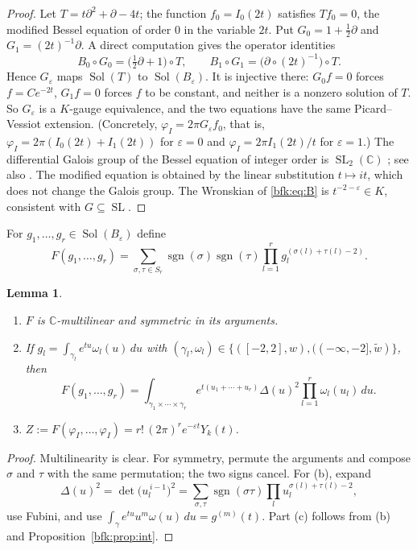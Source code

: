 \documentclass[11pt,a4paper]{article}
\newtheorem{lemma}[theorem]{Lemma}
\theoremstyle{definition}
\theoremstyle{remark}
\numberwithin{equation}{section}
\newcommand{\C}{\mathbb{C}}
\DeclareMathOperator{\Sol}{Sol}
\DeclareMathOperator{\sgn}{sgn}
\DeclareMathOperator{\SL}{SL}
\begin{document}
\begin{proof}
Let $T=t\partial^2+\partial-4t$; the function $f_0=I_0(2t)$ satisfies $Tf_0=0$, the modified Bessel equation of order $0$ in the variable $2t$. Put $G_0=1+\frac12\partial$ and $G_1=(2t)^{-1}\partial$. A direct computation gives the operator identities
\[
B_0\circ G_0=\bigl(\tfrac12\partial+1\bigr)\circ T,\qquad B_1\circ G_1=\bigl(\partial\circ(2t)^{-1}\bigr)\circ T .
\]
Hence $G_\varepsilon$ maps $\Sol(T)$ to $\Sol(B_\varepsilon)$. It is injective there: $G_0f=0$ forces $f=Ce^{-2t}$, $G_1f=0$ forces $f$ to be constant, and neither is a nonzero solution of $T$. So $G_\varepsilon$ is a $K$-gauge equivalence, and the two equations have the same Picard--Vessiot extension. (Concretely, $\varphi_I=2\pi G_\varepsilon f_0$, that is, $\varphi_I=2\pi(I_0(2t)+I_1(2t))$ for $\varepsilon=0$ and $\varphi_I=2\pi I_1(2t)/t$ for $\varepsilon=1$.) The differential Galois group of the Bessel equation of integer order is $\SL_2(\C)$ \cite{Kol68}; see also \cite{vdPS03}. The modified equation is obtained by the linear substitution $t\mapsto it$, which does not change the Galois group. The Wronskian of \eqref{bfk:eq:B} is $t^{-2-\varepsilon}\in K$, consistent with $G\subseteq\SL$.
\end{proof}

For $g_1,\dots,g_r\in\Sol(B_\varepsilon)$ define
\begin{equation}\label{bfk:eq:F}
F(g_1,\dots,g_r)=\sum_{\sigma,\tau\in S_r}\sgn(\sigma)\sgn(\tau)\prod_{l=1}^rg_l^{(\sigma(l)+\tau(l)-2)} .
\end{equation}

\begin{lemma}\label{bfk:lem:F}
\begin{enumerate}
\item[(a)] $F$ is $\C$-multilinear and symmetric in its arguments.
\item[(b)] If $g_l=\int_{\gamma_l}e^{tu}\omega_l(u)\,du$ with $(\gamma_l,\omega_l)\in\{([-2,2],w),((-\infty,-2],\tilde w)\}$, then
\[
F(g_1,\dots,g_r)=\int_{\gamma_1\times\cdots\times\gamma_r}e^{t(u_1+\cdots+u_r)}\Delta(u)^2\prod_{l=1}^r\omega_l(u_l)\,du .
\]
\item[(c)] $Z:=F(\varphi_I,\dots,\varphi_I)=r!\,(2\pi)^re^{-\varepsilon t}Y_k(t)$.
\end{enumerate}
\end{lemma}

\begin{proof}
Multilinearity is clear. For symmetry, permute the arguments and compose $\sigma$ and $\tau$ with the same permutation; the two signs cancel. For (b), expand
\[
\Delta(u)^2=\det\bigl(u_l^{\,i-1}\bigr)^2=\sum_{\sigma,\tau}\sgn(\sigma\tau)\prod_lu_l^{\sigma(l)+\tau(l)-2},
\]
use Fubini, and use $\int_\gamma e^{tu}u^m\omega(u)\,du=g^{(m)}(t)$. Part (c) follows from (b) and Proposition~\ref{bfk:prop:int}.
\end{proof}
\end{document}
